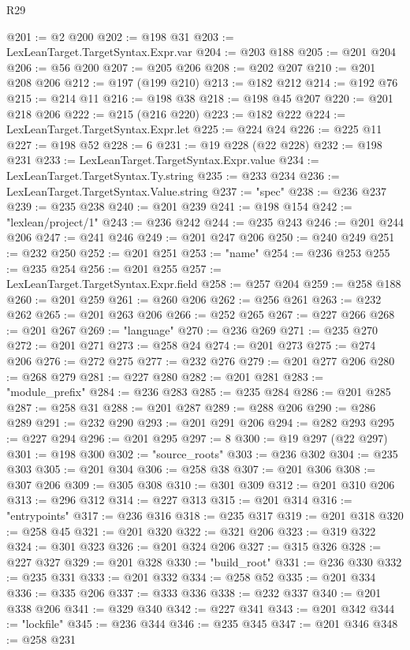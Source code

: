 \begin{lexlean}{R29}
\begin{coremodule}
@201 := @2 @200
@202 := @198 @31
@203 := LexLeanTarget.TargetSyntax.Expr.var
@204 := @203 @188
@205 := @201 @204
@206 := @56 @200
@207 := @205 @206
@208 := @202 @207
@210 := @201 @208 @206
@212 := @197 (@199 @210)
@213 := @182 @212
@214 := @192 @76
@215 := @214 @11
@216 := @198 @38
@218 := @198 @45 @207
@220 := @201 @218 @206
@222 := @215 (@216 @220)
@223 := @182 @222
@224 := LexLeanTarget.TargetSyntax.Expr.let
@225 := @224 @24
@226 := @225 @11
@227 := @198 @52
@228 := 6
@231 := @19 @228 (@22 @228)
@232 := @198 @231
@233 := LexLeanTarget.TargetSyntax.Expr.value
@234 := LexLeanTarget.TargetSyntax.Ty.string
@235 := @233 @234
@236 := LexLeanTarget.TargetSyntax.Value.string
@237 := "spec"
@238 := @236 @237
@239 := @235 @238
@240 := @201 @239
@241 := @198 @154
@242 := "lexlean/project/1"
@243 := @236 @242
@244 := @235 @243
@246 := @201 @244 @206
@247 := @241 @246
@249 := @201 @247 @206
@250 := @240 @249
@251 := @232 @250
@252 := @201 @251
@253 := "name"
@254 := @236 @253
@255 := @235 @254
@256 := @201 @255
@257 := LexLeanTarget.TargetSyntax.Expr.field
@258 := @257 @204
@259 := @258 @188
@260 := @201 @259
@261 := @260 @206
@262 := @256 @261
@263 := @232 @262
@265 := @201 @263 @206
@266 := @252 @265
@267 := @227 @266
@268 := @201 @267
@269 := "language"
@270 := @236 @269
@271 := @235 @270
@272 := @201 @271
@273 := @258 @24
@274 := @201 @273
@275 := @274 @206
@276 := @272 @275
@277 := @232 @276
@279 := @201 @277 @206
@280 := @268 @279
@281 := @227 @280
@282 := @201 @281
@283 := "module_prefix"
@284 := @236 @283
@285 := @235 @284
@286 := @201 @285
@287 := @258 @31
@288 := @201 @287
@289 := @288 @206
@290 := @286 @289
@291 := @232 @290
@293 := @201 @291 @206
@294 := @282 @293
@295 := @227 @294
@296 := @201 @295
@297 := 8
@300 := @19 @297 (@22 @297)
@301 := @198 @300
@302 := "source_roots"
@303 := @236 @302
@304 := @235 @303
@305 := @201 @304
@306 := @258 @38
@307 := @201 @306
@308 := @307 @206
@309 := @305 @308
@310 := @301 @309
@312 := @201 @310 @206
@313 := @296 @312
@314 := @227 @313
@315 := @201 @314
@316 := "entrypoints"
@317 := @236 @316
@318 := @235 @317
@319 := @201 @318
@320 := @258 @45
@321 := @201 @320
@322 := @321 @206
@323 := @319 @322
@324 := @301 @323
@326 := @201 @324 @206
@327 := @315 @326
@328 := @227 @327
@329 := @201 @328
@330 := "build_root"
@331 := @236 @330
@332 := @235 @331
@333 := @201 @332
@334 := @258 @52
@335 := @201 @334
@336 := @335 @206
@337 := @333 @336
@338 := @232 @337
@340 := @201 @338 @206
@341 := @329 @340
@342 := @227 @341
@343 := @201 @342
@344 := "lockfile"
@345 := @236 @344
@346 := @235 @345
@347 := @201 @346
@348 := @258 @231

\end{coremodule}
\end{lexlean}
